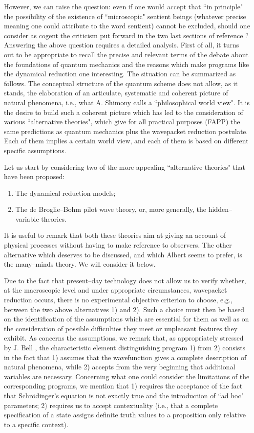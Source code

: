 \documentclass[12pt]{article}
\begin{document}
However, we can raise the question: even if one would accept that
``in principle" the possibility of the existence of ``microscopic"
sentient beings (whatever precise meaning one could attribute to
the word sentient) cannot be excluded, should one consider as
cogent the criticism put forward in the two last sections of
reference \cite{ap}? Answering the above question requires a
detailed analysis. First of all, it turns out to be appropriate to
recall the precise and relevant terms of the debate about the
foundations of quantum mechanics and the reasons which make
programs like the dynamical reduction one interesting. The
situation can be summarized as follows. The conceptual structure
of the quantum scheme does not allow, as it stands, the
elaboration of an articulate, systematic and coherent picture of
natural phenomena, i.e., what A. Shimony \cite{shipcqf} calls a
``philosophical world view". It is the desire to build such a
coherent picture which has led to the consideration of various
``alternative theories", which give for all practical purposes
(FAPP) the same predictions as quantum mechanics plus the
wavepacket reduction postulate. Each of them implies a certain
world view, and each of them is based on different specific
assumptions.

Let us start by considering two of the more appealing
``alternative theories" that have been proposed:
\begin{enumerate}
\item The dynamical reduction models;
\item The de Broglie--Bohm pilot wave theory, or, more generally,
the hidden--variable theories.
\end{enumerate}

It is useful to remark that both these theories aim at giving an
account of physical processes without having to make reference to
observers. The other alternative which deserves to be discussed,
and which Albert seems to prefer, is the many--minds theory. We
will consider it below.

Due to the fact that present--day technology does not allow us to
verify whether, at the macroscopic level and under appropriate
circumstances, wavepacket reduction occurs, there is no
experimental objective criterion to choose, e.g., between the two
above alternatives 1) and 2). Such a choice must then be based on
the identification of the assumptions which are essential for them
as well as on the consideration of possible difficulties they meet
or unpleasant features they exhibit. As concerns the assumptions,
we remark that, as appropriately stressed by J. Bell
\cite{bellam}, the characteristic element distinguishing program
1) from 2) consists in the fact that 1) assumes that the
wavefunction gives a complete description of natural phenomena,
while 2) accepts from the very beginning that additional variables
are necessary. Concerning what one could consider the limitations
of the corresponding programs, we mention that 1) requires the
acceptance of the fact that Schr\"odinger's equation is not
exactly true and the introduction of ``ad hoc" parameters; 2)
requires us to accept contextuality (i.e., that a complete
specification of a state assigns definite truth values to a
proposition only relative to a specific context).
\end{document}
